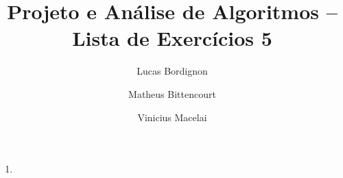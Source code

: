 \documentclass{article}
\title{Projeto e Análise de Algoritmos -- Lista de Exercícios 5}
\author{Lucas Bordignon \and Matheus Bittencourt \and Vinicius Macelai}
\date{}
\begin{document}
\maketitle

\begin{enumerate}
	\item

\end{enumerate}
\end{document}
